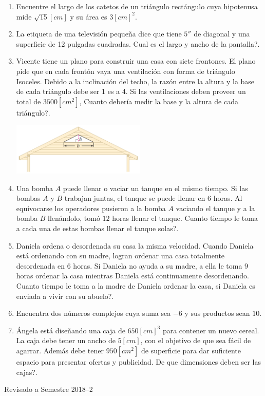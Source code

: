 \documentclass[letter,11pt]{article}
\newcommand\0{\mathbf{0}}
\begin{document}
\begin{enumerate}
\item Encuentre el largo de los catetos de un tri\'angulo rect\'angulo cuya hipotenusa mide $\sqrt{15}[cm]$ y su \'area es $3[cm]^2$.
\item La etiqueta de una televisi\'on pequeña dice que tiene $5''$ de diagonal y una superficie de 12 pulgadas cuadradas. \textquestiondown Cual es el largo y ancho de la pantalla?.
\item Vicente tiene un plano para construir una casa con siete frontones. El plano pide que en cada front\'on vaya una ventilaci\'on con forma de tri\'angulo Isoceles. Debido a la inclinaci\'on del techo, la raz\'on entre la altura y la base de cada tri\'angulo debe ser 1 es a 4. Si las ventilaciones deben proveer un total de $3500[cm^2]$, \textquestiondown Cuanto deber\'ia medir la base y la altura de cada tri\'angulo?.
\begin{center}
\includegraphics[width=0.5\textwidth]{./p1.jpg}
\end{center}
\item Una bomba $A$ puede llenar o vaciar un tanque en el mismo tiempo. Si las bombas $A$ y $B$ trabajan juntas, el tanque se puede llenar en $6$ horas. Al equivocarse los operadores pusieron a la bomba $A$ vaciando el tanque y a la bomba $B$ llen\'andolo, tom\'o $12$ horas llenar el tanque. \textquestiondown Cuanto tiempo le toma a cada una de estas bombas llenar el tanque solas?.

 \item Daniela ordena o desordenada su casa la misma velocidad. Cuando Daniela est\'a ordenando con su madre, logran ordenar una casa totalmente desordenada en $6$ horas. Si Daniela no ayuda a su madre, a ella le toma $9$ horas ordenar la casa mientras Daniela est\'a continuamente desordenando. \textquestiondown Cuanto tiempo le toma a la madre de Daniela ordenar la casa, si Daniela es enviada a vivir con su abuelo?.
 
 \item Encuentra dos n\'umeros complejos cuya suma sea $-6$ y sus productos sean $10$.
 
 \item \'Angela est\'a dise\~nando una caja de $650[cm]^3$ para contener un nuevo cereal. La caja debe tener un ancho de $5[cm]$, con el objetivo de que sea f\'acil de agarrar. Adem\'as debe tener $950[cm^2]$ de superficie para dar suficiente espacio para presentar  ofertas y publicidad. \textquestiondown De que dimensiones deben ser las cajas?.

\end{enumerate}

\vfill
\hfill Revisado a Semestre 2018--2
\end{document}
